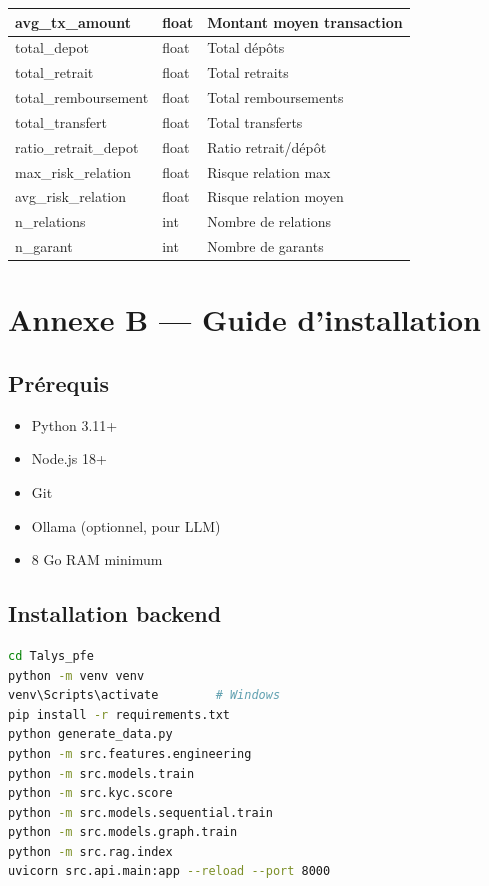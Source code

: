 \begin{longtable}{|p{4.5cm}|p{2cm}|p{7cm}|}
  avg\_tx\_amount & float & Montant moyen transaction \\
  \hline
  total\_depot & float & Total dépôts \\
  \hline
  total\_retrait & float & Total retraits \\
  \hline
  total\_remboursement & float & Total remboursements \\
  \hline
  total\_transfert & float & Total transferts \\
  \hline
  ratio\_retrait\_depot & float & Ratio retrait/dépôt \\
  \hline
  max\_risk\_relation & float & Risque relation max \\
  \hline
  avg\_risk\_relation & float & Risque relation moyen \\
  \hline
  n\_relations & int & Nombre de relations \\
  \hline
  n\_garant & int & Nombre de garants \\
  \hline
\end{longtable}

\chapter{Annexe B — Guide d'installation}
\label{ann:install}

\section{Prérequis}

\begin{itemize}[leftmargin=*]
  \item Python 3.11+
  \item Node.js 18+
  \item Git
  \item Ollama (optionnel, pour LLM)
  \item 8 Go RAM minimum
\end{itemize}

\section{Installation backend}

\begin{lstlisting}[language=bash,caption={Setup Python}]
cd Talys_pfe
python -m venv venv
venv\Scripts\activate        # Windows
pip install -r requirements.txt
python generate_data.py
python -m src.features.engineering
python -m src.models.train
python -m src.kyc.score
python -m src.models.sequential.train
python -m src.models.graph.train
python -m src.rag.index
uvicorn src.api.main:app --reload --port 8000
\end{lstlisting}

